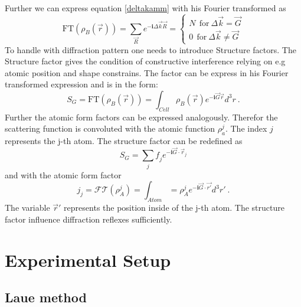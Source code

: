 	Further we can express equation \ref{deltakamm} with his Fourier transformed as 
	\begin{equation}
			\mathrm{FT}(\rho_B (\vec r))=\sum_{\vec R} e^{-\boldsymbol{i} \Delta \vec k \vec R}=	
			\begin{cases}
			
			N~~\mathrm{for}~\Delta \vec k = \vec G \\
			0~~\mathrm{for}~\Delta \vec k \neq \vec G
			
			\end{cases}
	\end{equation}
	To handle with diffraction pattern one needs to introduce Structure factors. The Structure factor gives the condition of constructive interference relying on e.g atomic position and shape constrains. The factor can be express in his Fourier transformed expression and is in the form:
	\begin{equation}
			S_G = \mathrm{FT}(\rho_B(\vec r))= \int_{Cell} \rho_B(\vec r) e^{-\boldsymbol{i} \vec G \vec r}d^3 r~\mathrm{.}
	\end{equation}
	Further the atomic form factors can be expressed analogously. Therefor the scattering function is convoluted with the atomic function $\rho_a^j$. The index $j$ represents the j-th atom. The structure factor can be redefined as
	\begin{equation}
		S_G= \sum_j \mathit{f}_j e^{-\boldsymbol{i} \vec G \cdot \vec {r}_j}
	\end{equation}
	and with the atomic form factor
	\begin{equation}
		\mathit{j}_j=\mathcal{FT}(\rho^j_A)=\int_{Atom}=\rho^j_A e^{-\boldsymbol{i}\vec G \cdot \vec{r'}}d^3r'~\mathrm{.}
	\end{equation}
	The variable $\vec{r}'$ represents the position inside of the j-th atom. The structure factor influence diffraction reflexes sufficiently.

	\section{Experimental Setup}
	\subsection{Laue method}
	
